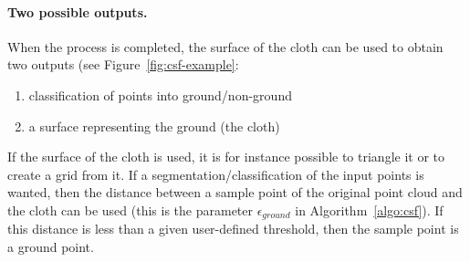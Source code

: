 \paragraph{Two possible outputs.}
When the process is completed, the surface of the cloth can be used to obtain two outputs (see Figure~\ref{fig:csf-example}:
\begin{enumerate}
  \item classification of points into ground/non-ground
  \item a surface representing the ground (the cloth)
\end{enumerate}
If the surface of the cloth is used, it is for instance possible to triangle it or to create a grid from it.
If a segmentation/classification of the input points is wanted, then the distance between a sample point of the original point cloud and the cloth can be used (this is the parameter $\epsilon_{ground}$ in Algorithm~\ref{algo:csf}).
If this distance is less than a given user-defined threshold, then the sample point is a ground point.
